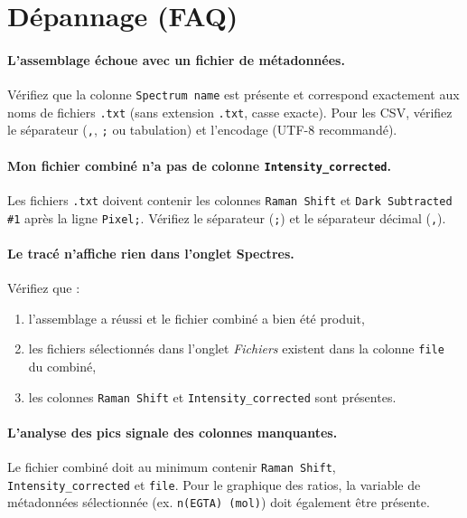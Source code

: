 \documentclass[12pt, a4paper]{article}
\begin{document}
\section{Dépannage (FAQ)}

\paragraph{L'assemblage échoue avec un fichier de métadonnées.}
Vérifiez que la colonne \texttt{Spectrum name} est présente et correspond
exactement aux noms de fichiers \texttt{.txt} (sans extension \texttt{.txt},
casse exacte). Pour les CSV, vérifiez le séparateur (\texttt{,}, \texttt{;}
ou tabulation) et l'encodage (UTF-8 recommandé).

\paragraph{Mon fichier combiné n'a pas de colonne \texttt{Intensity\_corrected}.}
Les fichiers \texttt{.txt} doivent contenir les colonnes \texttt{Raman Shift}
et \texttt{Dark Subtracted \#1} après la ligne \texttt{Pixel;}. Vérifiez le
séparateur (\texttt{;}) et le séparateur décimal (\texttt{,}).

\paragraph{Le tracé n'affiche rien dans l'onglet Spectres.}
Vérifiez que :
\begin{enumerate}
  \item l'assemblage a réussi et le fichier combiné a bien été produit,
  \item les fichiers sélectionnés dans l'onglet \textit{Fichiers} existent
        dans la colonne \texttt{file} du combiné,
  \item les colonnes \texttt{Raman Shift} et \texttt{Intensity\_corrected}
        sont présentes.
\end{enumerate}

\paragraph{L'analyse des pics signale des colonnes manquantes.}
Le fichier combiné doit au minimum contenir \texttt{Raman Shift},
\texttt{Intensity\_corrected} et \texttt{file}. Pour le graphique des ratios,
la variable de métadonnées sélectionnée (ex. \texttt{n(EGTA) (mol)}) doit
également être présente.
\end{document}
